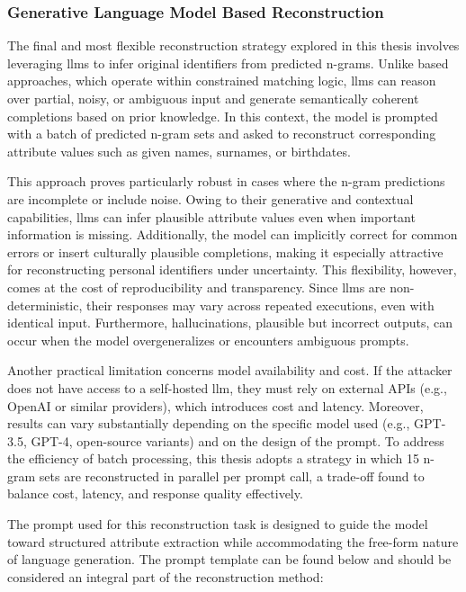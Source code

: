 \subsubsection{Generative Language Model Based Reconstruction}
\label{sec:generative-llm-reconstruction}

The final and most flexible reconstruction strategy explored in this thesis involves leveraging \ac{llm}s to infer original identifiers from predicted n-grams.
Unlike based approaches, which operate within constrained matching logic, \ac{llm}s can reason over partial, noisy, or ambiguous input and generate semantically coherent completions based on prior knowledge.
In this context, the model is prompted with a batch of predicted n-gram sets and asked to reconstruct corresponding attribute values such as given names, surnames, or birthdates.

This approach proves particularly robust in cases where the n-gram predictions are incomplete or include noise.
Owing to their generative and contextual capabilities, \ac{llm}s can infer plausible attribute values even when important information is missing.
Additionally, the model can implicitly correct for common errors or insert culturally plausible completions, making it especially attractive for reconstructing personal identifiers under uncertainty.
This flexibility, however, comes at the cost of reproducibility and transparency. Since \ac{llm}s are non-deterministic, their responses may vary across repeated executions, even with identical input.
Furthermore, hallucinations, plausible but incorrect outputs, can occur when the model overgeneralizes or encounters ambiguous prompts.

Another practical limitation concerns model availability and cost.
If the attacker does not have access to a self-hosted \ac{llm}, they must rely on external APIs (e.g., OpenAI or similar providers), which introduces cost and latency.
Moreover, results can vary substantially depending on the specific model used (e.g., GPT-3.5, GPT-4, open-source variants) and on the design of the prompt.
To address the efficiency of batch processing, this thesis adopts a strategy in which 15 n-gram sets are reconstructed in parallel per prompt call, a trade-off found to balance cost, latency, and response quality effectively.

The prompt used for this reconstruction task is designed to guide the model toward structured attribute extraction while accommodating the free-form nature of language generation.
The prompt template can be found below and should be considered an integral part of the reconstruction method:

